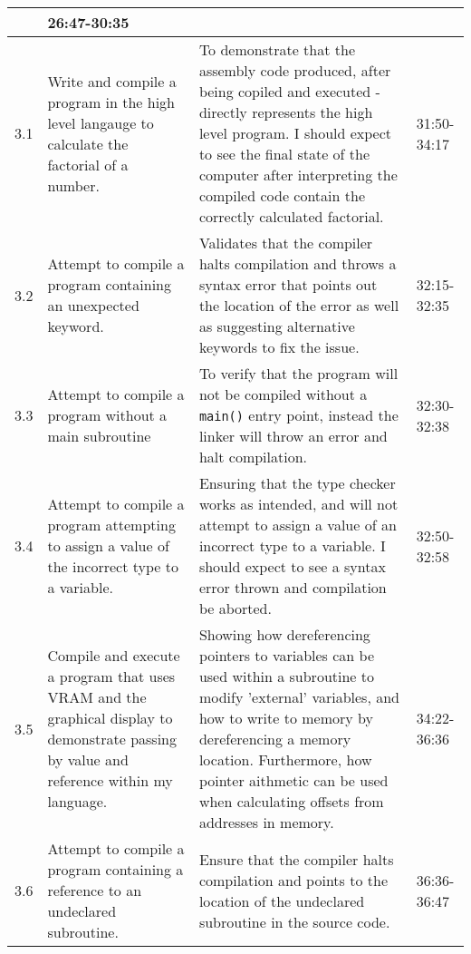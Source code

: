 \begin{longtable}{|p{1cm}|p{5cm}|p{5cm}|p{2cm}|}
        & 
        26:47-30:35
        \\
    \hline
        3.1
        & 
        Write and compile a program in the high level langauge to calculate the factorial of a number.
        & 
        To demonstrate that the assembly code produced, after being copiled and executed - directly represents the high level program. I should expect to see the final state of the computer after interpreting the compiled code contain the correctly calculated factorial. 
        & 
        31:50-34:17
        \\
    \hline
        3.2
        & 
        Attempt to compile a program containing an unexpected keyword.
        &
        Validates that the compiler halts compilation and throws a syntax error that points out the location of the error as well as suggesting alternative keywords to fix the issue. 
        & 
        32:15-32:35
        \\
    \hline
        3.3
        & 
        Attempt to compile a program without a main subroutine
        &
        To verify that the program will not be compiled without a \texttt{main()} entry point, instead the linker will throw an error and halt compilation. 
        & 
        32:30-32:38
        \\
    \hline
        3.4
        & 
        Attempt to compile a program attempting to assign a value of the incorrect type to a variable.
        &
        Ensuring that the type checker works as intended, and will not attempt to assign a value of an incorrect type to a variable. I should expect to see a syntax error thrown and compilation be aborted.
        & 
        32:50-32:58
        \\
    \hline
        3.5
        & 
        Compile and execute a program that uses VRAM and the graphical display to demonstrate passing by value and reference within my language. 
        &
        Showing how dereferencing pointers to variables can be used within a subroutine to modify 'external' variables, and how to write to memory by dereferencing a memory location. Furthermore, how pointer aithmetic can be used when calculating offsets from addresses in memory. 
        & 
        34:22-36:36
        \\
    \hline
        3.6
        & 
        Attempt to compile a program containing a reference to an undeclared subroutine.
        &
        Ensure that the compiler halts compilation and points to the location of the undeclared subroutine in the source code. 
        & 
        36:36-36:47
        \\

\end{longtable}
